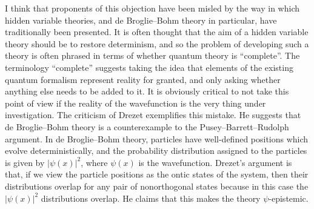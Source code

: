 \documentclass[DIV=calc,fontsize=12pt]{scrartcl} %
\theoremstyle{definition}
\theoremstyle{plain}
\begin{document}
I think that proponents of this objection have been misled by the way
in which hidden variable theories, and de Broglie--Bohm theory in
particular, have traditionally been presented.  It is often thought
that the aim of a hidden variable theory should be to restore
determinism, and so the problem of developing such a theory is often
phrased in terms of whether quantum theory is ``complete''.  The
terminology ``complete'' suggests taking the idea that elements of the
existing quantum formalism represent reality for granted, and only
asking whether anything else needs to be added to it.  It is obviously
critical to not take this point of view if the reality of the
wavefunction is the very thing under investigation.  The criticism of
Drezet \cite{Drezet2012, Drezet2012a} exemplifies this mistake.  He
suggests that de Broglie--Bohm theory is a counterexample to the Pusey--Barrett--Rudolph
argument.  In de Broglie--Bohm theory, particles have well-defined
positions which evolve deterministically, and the probability
distribution assigned to the particles is given by $|\psi(x)|^2$,
where $\psi(x)$ is the wavefunction.  Drezet's argument is that, if we
view the particle positions as the ontic states of the system, then
their distributions overlap for any pair of nonorthogonal states
because in this case the $|\psi(x)|^2$ distributions overlap.  He
claims that this makes the theory $\psi$-epistemic.
\end{document}
